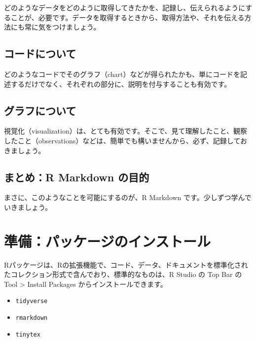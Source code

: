 \documentclass[
  xelatex, ja=standard]{bxjsbook}
\providecommand{\tightlist}{%
  \setlength{\itemsep}{0pt}\setlength{\parskip}{0pt}}
\theoremstyle{definition}
\theoremstyle{definition}
\theoremstyle{definition}
\theoremstyle{definition}
\theoremstyle{remark}
\begin{document}
どのようなデータをどのように取得してきたかを、記録し、伝えられるようにすることが、必要です。データを取得するときから、取得方法や、それを伝える方法にも常に気をつけましょう。

\hypertarget{ux30b3ux30fcux30c9ux306bux3064ux3044ux3066}{%
\subsection{コードについて}\label{ux30b3ux30fcux30c9ux306bux3064ux3044ux3066}}

どのようなコードでそのグラフ（chart）などが得られたかも、単にコードを記述するだけでなく、それぞれの部分に、説明を付与することも有効です。

\hypertarget{ux30b0ux30e9ux30d5ux306bux3064ux3044ux3066}{%
\subsection{グラフについて}\label{ux30b0ux30e9ux30d5ux306bux3064ux3044ux3066}}

視覚化（visualization）は、とても有効です。そこで、見て理解したこと、観察したこと（observations）などは、簡単でも構いませんから、必ず、記録しておきましょう。

\hypertarget{ux307eux3068ux3081r-markdown-ux306eux76eeux7684}{%
\subsection{まとめ：R Markdown の目的}\label{ux307eux3068ux3081r-markdown-ux306eux76eeux7684}}

まさに、このようなことを可能にするのが、R Markdown です。少しずつ学んでいきましょう。

\hypertarget{ux6e96ux5099ux30d1ux30c3ux30b1ux30fcux30b8ux306eux30a4ux30f3ux30b9ux30c8ux30fcux30eb}{%
\section{準備：パッケージのインストール}\label{ux6e96ux5099ux30d1ux30c3ux30b1ux30fcux30b8ux306eux30a4ux30f3ux30b9ux30c8ux30fcux30eb}}

Rパッケージは、Rの拡張機能で、コード、データ、ドキュメントを標準化されたコレクション形式で含んでおり、標準的なものは、R Studio の Top Bar の Tool \textgreater{} Install Packages からインストールできます。

\begin{itemize}
\tightlist
\item
  \texttt{tidyverse}
\item
  \texttt{rmarkdown}
\item
  \texttt{tinytex}
\end{itemize}
\end{document}
